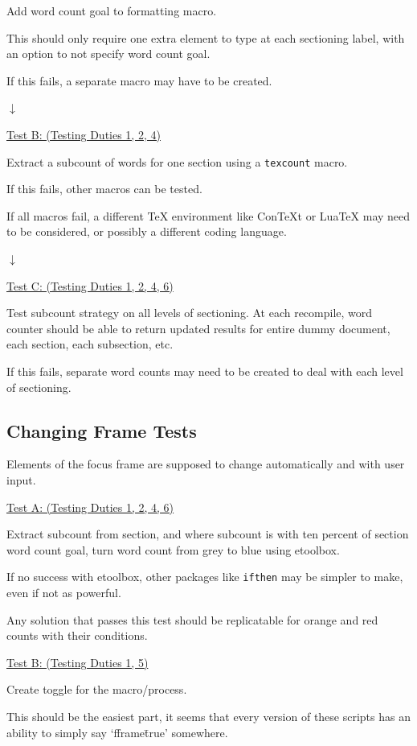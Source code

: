 \documentclass[12pt]{article}
\begin{document}
Add word count goal to formatting macro.

This should only require one extra element to type at each sectioning label, with an option to not specify word count goal.

If this fails, a separate macro may have to be created.

$\downarrow$

\underline{Test B: (Testing Duties 1, 2, 4)}

Extract a subcount of words for one section using a \texttt{texcount} macro.

If this fails, other macros can be tested.

If all macros fail, a different TeX environment like ConTeXt or LuaTeX may need to be considered, or possibly a different coding language. 

$\downarrow$

\underline{Test C: (Testing Duties 1, 2, 4, 6)}

Test subcount strategy on all levels of sectioning. At each recompile, word counter should be able to return updated results for entire dummy document, each section, each subsection, etc.

If this fails, separate word counts may need to be created to deal with each level of sectioning.

\vspace{2em}
\subsection*{Changing Frame Tests}

Elements of the focus frame are supposed to change automatically and with user input.

\underline{Test A: (Testing Duties 1, 2, 4, 6)}

Extract subcount from section, and where subcount is with ten percent of section word count goal, turn word count from grey to blue using etoolbox.

If no success with etoolbox, other packages like \texttt{ifthen} may be simpler to make, even if not as powerful.

Any solution that passes this test should be replicatable for orange and red counts with their conditions.

\vspace{1em}
\underline{Test B: (Testing Duties 1, 5)}

Create toggle for the macro/process.

This should be the easiest part, it seems that every version of these scripts has an ability to simply say `fframe\=true' somewhere.
\end{document}
